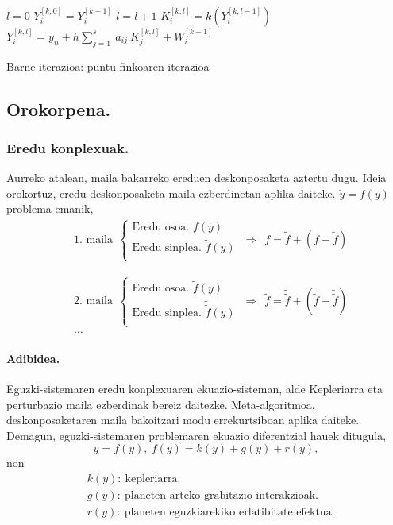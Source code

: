\begin{algorithm}[H]
 \BlankLine
  $l=0$\;
  $Y_{i}^{[k,0]}=Y_{i}^{[k-1]}$\;
  {
   \BlankLine
   $l=l+1$\;  
   \BlankLine
   $K_{i}^{[k,l]}=k(Y_{i}^{[k,l-1]})$\;
   $Y_{i}^{[k,l]}=y_{n} + h \sum\limits_{j=1}^{s} \ a_{ij} \ K_{j}^{[k,l]}  +  W_{i}^{[k-1]} $\;
  }
 \caption{Barne-iterazioa: puntu-finkoaren iterazioa}
 \label{alg:bpf}
\end{algorithm}


\subsection*{Orokorpena.}

\subsubsection*{Eredu konplexuak.}
Aurreko atalean, maila bakarreko ereduen deskonposaketa aztertu dugu. Ideia orokortuz, eredu deskonposaketa maila ezberdinetan aplika daiteke.  $\dot{y} =f(y)$ problema emanik, 
\begin{align*}
&\mbox{1. maila} \ \
\left \{ \begin{array}{c}
  \mbox{Eredu osoa.   } f(y) \\[.25cm]
  \mbox{Eredu sinplea.    } \tilde{f}(y)  \\
\end{array} \right.
\ \Rightarrow \ \
f =\tilde{f}+(f-\tilde{f})  
\end{align*}

\begin{align*}
&\mbox{2. maila} \ \
\left \{ \begin{array}{c}
  \mbox{Eredu osoa.   }\tilde{f}(y) \\[.25cm]
  \mbox{Eredu sinplea.    }\tilde{\tilde{f}}(y)  \\
\end{array} \right.
\ \Rightarrow \ \
\tilde{f} =\tilde{\tilde{f}}+({\tilde{f}}-\tilde{\tilde{f}})\\
&\dots  
\end{align*}

\paragraph*{Adibidea.}
Eguzki-sistemaren eredu konplexuaren ekuazio-sisteman, alde Kepleriarra eta perturbazio maila ezberdinak bereiz daitezke. Meta-algoritmoa, deskonposaketaren maila bakoitzari modu errekurtsiboan aplika daiteke. Demagun, eguzki-sistemaren problemaren ekuazio diferentzial hauek ditugula,
\begin{equation*}
\dot{y}=f(y), \ f(y)=k(y)+g(y)+r(y),
\end{equation*}
non
\begin{align*}
&k(y): \ \text{kepleriarra.}\\
&g(y): \ \text{planeten arteko grabitazio interakzioak.}\\
&r(y): \ \text{planeten eguzkiarekiko erlatibitate efektua.}
\end{align*}

